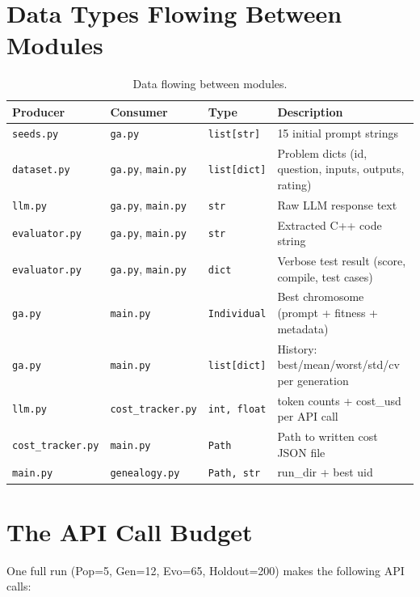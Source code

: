 \documentclass[11pt,a4paper]{report}
\newcommand{\pyfile}[1]{\texttt{#1}}
\begin{document}
\section{Data Types Flowing Between Modules}

\begin{table}[h]
\centering
\begin{tabular}{@{}p{3cm}p{3.2cm}p{2.5cm}p{5cm}@{}}
\toprule
\textbf{Producer} & \textbf{Consumer} & \textbf{Type} & \textbf{Description} \\
\midrule
\pyfile{seeds.py}       & \pyfile{ga.py}               & \texttt{list[str]}   & 15 initial prompt strings \\
\pyfile{dataset.py}     & \pyfile{ga.py}, \pyfile{main.py} & \texttt{list[dict]}  & Problem dicts (id, question, inputs, outputs, rating) \\
\pyfile{llm.py}         & \pyfile{ga.py}, \pyfile{main.py} & \texttt{str}         & Raw LLM response text \\
\pyfile{evaluator.py}   & \pyfile{ga.py}, \pyfile{main.py} & \texttt{str}         & Extracted C++ code string \\
\pyfile{evaluator.py}   & \pyfile{ga.py}, \pyfile{main.py} & \texttt{dict}        & Verbose test result (score, compile, test cases) \\
\pyfile{ga.py}          & \pyfile{main.py}             & \texttt{Individual}  & Best chromosome (prompt + fitness + metadata) \\
\pyfile{ga.py}          & \pyfile{main.py}             & \texttt{list[dict]}  & History: best/mean/worst/std/cv per generation \\
\pyfile{llm.py}         & \pyfile{cost\_tracker.py}   & \texttt{int, float}  & token counts + cost\_usd per API call \\
\pyfile{cost\_tracker.py} & \pyfile{main.py}           & \texttt{Path}        & Path to written cost JSON file \\
\pyfile{main.py}        & \pyfile{genealogy.py}        & \texttt{Path, str}   & run\_dir + best uid \\
\bottomrule
\end{tabular}
\caption{Data flowing between modules.}
\end{table}

\section{The API Call Budget}

One full run (Pop=5, Gen=12, Evo=65, Holdout=200) makes the following API calls:
\end{document}
